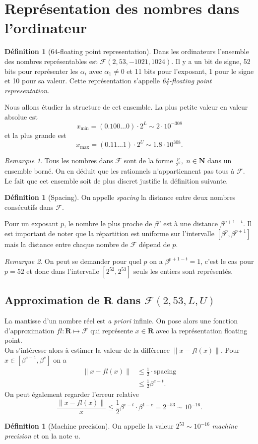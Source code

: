 \documentclass[12pt]{book}
\theoremstyle{definition}
\newtheorem{definition}[lemma]{Définition}
\theoremstyle{remark}
\newtheorem*{remark}{Remarque}
\begin{document}
	\section{Représentation des nombres dans l'ordinateur}
	\begin{definition}[64-floating point representation]
		Dans les ordinateurs l'ensemble des nombres représentables est $\mathcal{F}(2,53,-1021,1024)$.
		Il y a un bit de signe, 52 bits pour représenter les $\alpha_i$ avec $\alpha_1 \neq 0$ et 11 bits pour l'exposant, 1 pour le signe et 10 pour sa valeur. Cette représentation s'appelle \emph{64-floating point representation}.
	\end{definition}
	Nous allons étudier la structure de cet ensemble. La plus petite valeur en valeur absolue est \[
		x_{\min} = (0.100\ldots0)\cdot 2^L \sim 2\cdot 10^{-308}
	\]  
	et la plus grande est \[
		x_{\max} = (0.11\ldots1)\cdot2^U \sim 1.8\cdot 10^{308}
	.\] 
	\begin{remark}
		Tous les nombres dans $\mathcal{F}$ sont de la forme $\frac{p}{2^n}, \; n \in \mathbf{N}$ dans un ensemble borné. On en déduit que les rationnels n'appartiennent pas tous à $\mathcal{F}$. Le fait que cet ensemble soit de plus discret justifie la définition suivante.
	\end{remark}
	\begin{definition}[Spacing]
		On appelle \emph{spacing} la distance entre deux nombres consécutifs dans $\mathcal{F}$.
	\end{definition}
	Pour un exposant $p$, le nombre le plus proche de  $\beta^p$ est à une distance  $\beta^{p+1-t}$. Il est important de noter que la répartition est uniforme sur l'intervalle $[\beta^p,\beta^{p+1}]$ mais la distance entre chaque nombre de $\mathcal{F}$ dépend de $p$.
	\begin{remark}
		On peut se demander pour quel $p$ on a  $\beta^{p+1-t} = 1$, c'est le cas pour $p=52$ et donc dans l'intervalle $[2^{52},2^{53}]$ seuls les entiers sont représentés. 
	\end{remark}
	\subsection{Approximation de $\mathbf{R}$ dans $\mathcal{F}(2,53,L,U)$}
	La mantisse d'un nombre réel est \textit{a priori} infinie. On pose alors une fonction d'approximation $fl : \mathbf{R} \longmapsto \mathcal{F}$ qui représente $x\in \mathbf{R}$ avec la représentation floating point.\\
	On s'intéresse alors à estimer la valeur de la différence $\|x-fl(x)\|$. Pour $x\in [\beta^{e-1},\beta^e]$ on a 
	 \begin{align*}
		 \|x-fl(x)\| &\le \frac{1}{2} \cdot \text{spacing} \\
			   &\le \frac{1}{2}\beta^{e-t}
	.\end{align*}
	On peut également regarder l'erreur relative \[
		\frac{\|x-fl(x)\|}{x} \le \frac{1}{2}\beta^{e-t}\cdot\beta^{1-e} = 2^{-53} \sim 10^{-16}
	.\] 
	\begin{definition}[Machine precision]
	On appelle la valeur $2^{53} \sim 10^{-16}$ \emph{machine precision} et on la note $u$.
	\end{definition}
\end{document}
